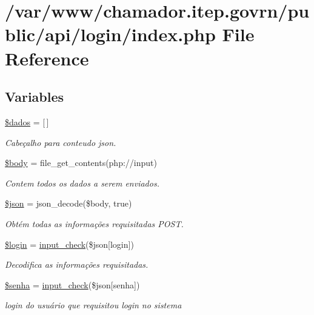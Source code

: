 \hypertarget{login_2index_8php}{}\section{/var/www/chamador.itep.\+govrn/public/api/login/index.php File Reference}
\label{login_2index_8php}
\subsection*{Variables}
\begin{DoxyCompactItemize}
\item 
\hyperlink{login_2index_8php_a252370d95039a38fa11afab784725d58}{\$dados} = \mbox{[}$\,$\mbox{]}
\begin{DoxyCompactList}\small\item\em Cabeçalho para conteudo json. \end{DoxyCompactList}\item 
\hyperlink{login_2index_8php_a26b9f9373f7bb79dfcf8a86dff086b45}{\$body} = file\+\_\+get\+\_\+contents(\textquotesingle{}php\+://input\textquotesingle{})
\begin{DoxyCompactList}\small\item\em Contem todos os dados a serem enviados. \end{DoxyCompactList}\item 
\hyperlink{login_2index_8php_acedd13b51401130848ce18f4d5c52605}{\$json} = json\+\_\+decode(\$body, true)
\begin{DoxyCompactList}\small\item\em Obtém todas as informações requisitadas P\+O\+ST. \end{DoxyCompactList}\item 
\hyperlink{login_2index_8php_afc31993e855f9631572adfedcfe6f34b}{\$login} = \hyperlink{_header_8php_a8909d20d656fecf83ebaa2bed0cab2c1}{input\+\_\+check}(\$json\mbox{[}\textquotesingle{}login\textquotesingle{}\mbox{]})
\begin{DoxyCompactList}\small\item\em Decodifica as informações requisitadas. \end{DoxyCompactList}\item 
\hyperlink{login_2index_8php_a3678c8769c9698fd30581c1016c5f475}{\$senha} = \hyperlink{_header_8php_a8909d20d656fecf83ebaa2bed0cab2c1}{input\+\_\+check}(\$json\mbox{[}\textquotesingle{}senha\textquotesingle{}\mbox{]})
\begin{DoxyCompactList}\small\item\em login do usuário que requisitou login no sistema \end{DoxyCompactList}\item 

\end{DoxyCompactItemize}
